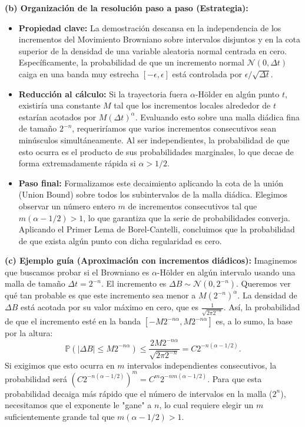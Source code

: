 \documentclass[11pt, letterpaper]{article}
\begin{document}
\begin{solucion}
    \textbf{(b) Organización de la resolución paso a paso (Estrategia):}
    \begin{itemize}
        \item[(i)] \textbf{Propiedad clave:} La demostración descansa en la independencia de los incrementos del Movimiento Browniano sobre intervalos disjuntos y en la cota superior de la densidad de una variable aleatoria normal centrada en cero. Específicamente, la probabilidad de que un incremento normal $\mathcal{N}(0, \Delta t)$ caiga en una banda muy estrecha $[-\epsilon, \epsilon]$ está controlada por $\epsilon / \sqrt{\Delta t}$.
        \item[(ii)] \textbf{Reducción al cálculo:} Si la trayectoria fuera $\alpha$-Hölder en algún punto $t$, existiría una constante $M$ tal que los incrementos locales alrededor de $t$ estarían acotados por $M(\Delta t)^\alpha$. Evaluando esto sobre una malla diádica fina de tamaño $2^{-n}$, requeriríamos que varios incrementos consecutivos sean minúsculos simultáneamente. Al ser independientes, la probabilidad de que esto ocurra es el producto de sus probabilidades marginales, lo que decae de forma extremadamente rápida si $\alpha > 1/2$.
        \item[(iii)] \textbf{Paso final:} Formalizamos este decaimiento aplicando la cota de la unión (Union Bound) sobre todos los subintervalos de la malla diádica. Elegimos observar un número entero $m$ de incrementos consecutivos tal que $m(\alpha - 1/2) > 1$, lo que garantiza que la serie de probabilidades converja. Aplicando el Primer Lema de Borel-Cantelli, concluimos que la probabilidad de que exista algún punto con dicha regularidad es cero.
    \end{itemize}

    \vspace{3mm}
    \textbf{(c) Ejemplo guía (Aproximación con incrementos diádicos):}
    Imaginemos que buscamos probar si el Browniano es $\alpha$-Hölder en algún intervalo usando una malla de tamaño $\Delta t = 2^{-n}$. 
    El incremento es $\Delta B \sim \mathcal{N}(0, 2^{-n})$. Queremos ver qué tan probable es que este incremento sea menor a $M (2^{-n})^\alpha$.
    La densidad de $\Delta B$ está acotada por su valor máximo en cero, que es $\frac{1}{\sqrt{2\pi 2^{-n}}}$. Así, la probabilidad de que el incremento esté en la banda $[-M 2^{-n\alpha}, M 2^{-n\alpha}]$ es, a lo sumo, la base por la altura:
    \[ \mathbb{P}(|\Delta B| \le M 2^{-n\alpha}) \le \frac{2 M 2^{-n\alpha}}{\sqrt{2\pi 2^{-n}}} = C 2^{-n(\alpha - 1/2)}. \]
    Si exigimos que esto ocurra en $m$ intervalos independientes consecutivos, la probabilidad será $(C 2^{-n(\alpha - 1/2)})^m = C^m 2^{-nm(\alpha - 1/2)}$. Para que esta probabilidad decaiga más rápido que el número de intervalos en la malla ($2^n$), necesitamos que el exponente le "gane" a $n$, lo cual requiere elegir un $m$ suficientemente grande tal que $m(\alpha - 1/2) > 1$.


\end{solucion}
\end{document}
